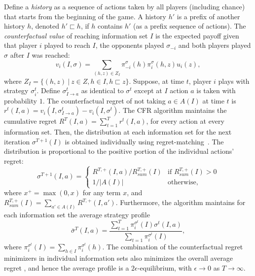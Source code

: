 Define a {\it history} as a sequence of actions taken by all players (including chance) that starts from the beginning of the game. 
A history $h'$ is a prefix of another history $h$, denoted $h' \sqsubset h$, if $h$ contains $h'$ (as a prefix sequence of actions).  
The {\it counterfactual value} of reaching information set $I$ is the expected payoff given that player $i$ played to reach $I$, the opponents played
$\sigma_{-i}$ and both players played $\sigma$ after $I$ was reached:
\begin{equation}
\label{eq:cfv}
v_i(I,\sigma) = \sum_{(h,z) \in Z_I} \pi^{\sigma}_{-i}(h) \pi^{\sigma}_{i}(h,z) u_i(z), 
\end{equation}
where $Z_I = \{ (h,z)~|~z \in Z, h \in I, h \sqsubset z \}$.
Suppose, at time $t$, player $i$ plays with strategy $\sigma^t_i$.
Define $\sigma^t_{I \rightarrow a}$ as identical to $\sigma^t$ except at $I$ action $a$ is taken with probability $1$.
The counterfactual regret of not taking $a \in A(I)$ at time $t$ is $r^t(I,a) = v_i(I,\sigma^t_{I \rightarrow a}) - v_i(I,\sigma^t)$.
The CFR algorithm maintains the cumulative regret $R^T(I,a) = \sum_{t=1}^T r^t(I,a)$, for every action at every information set.
Then, the distribution at each information set for the next iteration $\sigma^{T+1}(I)$ is obtained individually using
regret-matching~\cite{Hart00}. The distribution is proportional to the positive portion of the individual actions' regret:
\begin{equation*}
\label{eq:rm}
\sigma^{T+1}(I,a) = \left\{
\begin{array}{ll}
R^{T,+}(I,a) / R^{T,+}_{sum}(I) & \mbox{if } R^{T,+}_{sum}(I) > 0 \\ 
1 / |A(I)|                   & \mbox{otherwise,}
\end{array} \right.
\end{equation*}
where $x^+ = \max(0,x)$ for any term $x$, and $R^{T,+}_{sum}(I) = \sum_{a' \in A(I)} R^{T,+}(I,a')$. 
Furthermore, the algorithm maintains for each information set the average   strategy profile
\begin{equation}
\bar{\sigma}^T(I,a) = \frac{\sum_{t=1}^T \pi^{\sigma^t}_i(I) \sigma^t(I,a)}{\sum_{t=1} \pi^{\sigma^t}_i(I)}, 
\end{equation}
where $\pi^{\sigma^t}_i(I) = \sum_{h \in I}\pi^{\sigma^t}_i(h)$.
The combination of the counterfactual regret minimizers in individual information sets also minimizes the overall 
average regret \cite{CFR}, and hence the average profile is a  $2\epsilon$-equilibrium, with $\epsilon \rightarrow 0$
as $T \rightarrow \infty$.

